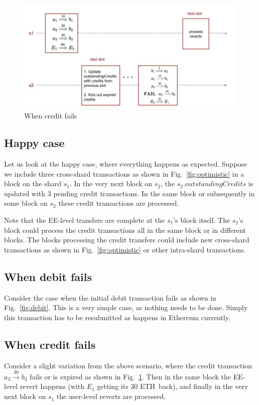 \documentclass{IEEEtran}
\newcommand{\eth}[0]{ETH~}
\begin{document}
\begin{figure}
	\centering
	\includegraphics[scale=0.4]{Credit.jpg}
	\caption{When credit fails\label{fig:credit}}
\end{figure}

\subsection{Happy case}
Let us look at the happy case, where everything happens as expected. Suppose we include three cross-shard transactions as shown in Fig.~\ref{fig:optimistic} in a block on the shard $s_1$. In the very next block on $s_2$, the $s_2.outstandingCredits$ is updated with 3 pending credit transactions. In the same block or subsequently in some block on $s_2$ these credit transactions are processed. 

Note that the EE-level transfers are complete at the $s_1$'s block itself. The $s_2$'s block could process the credit transactions all in the same block or in different blocks. The blocks processing the credit transfers could include new cross-shard transactions as shown in Fig.~\ref{fig:optimistic} or other intra-shard transactions.

\subsection{When debit fails}
Consider the case when the initial debit transaction fails as shown in Fig.~\ref{fig:debit}. This is a very simple case, as nothing needs to be done. Simply this transaction has to be resubmitted as happens in Ethereum currently.

\subsection{When credit fails}
Consider a slight variation from the above scenario, where the credit transaction $a_3 \stackrel{30}{\longrightarrow} b_3$ fails or is expired as shown in Fig.~\ref{fig:credit}. Then in the same block the EE-level revert happens (with $E_1$ getting its $30$ \eth back), and finally in the very next block on $s_1$ the user-level reverts are processed.
\end{document}
